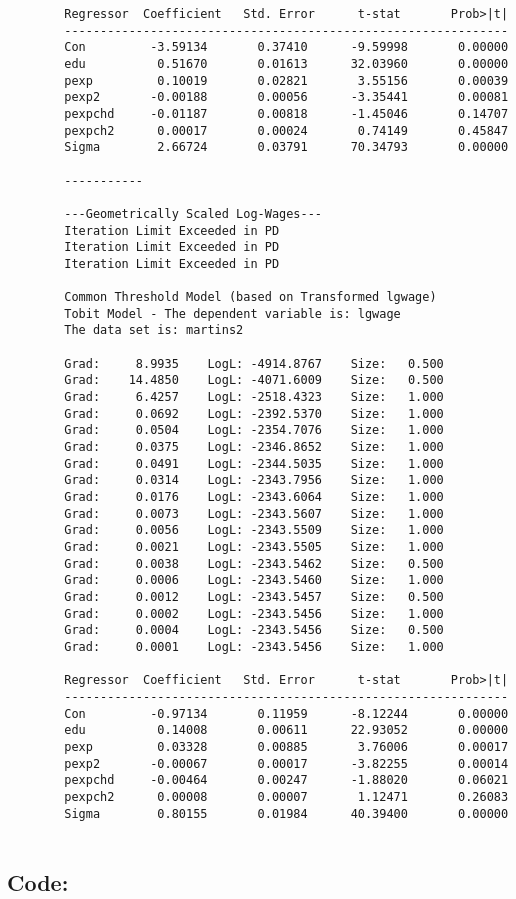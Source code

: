 \documentclass[12pt]{article}
\begin{document}
\begin{verbatim}
		Regressor  Coefficient	 Std. Error 	 t-stat       Prob>|t|
		--------------------------------------------------------------
		Con         -3.59134       0.37410      -9.59998       0.00000 
		edu          0.51670       0.01613      32.03960       0.00000 
		pexp         0.10019       0.02821       3.55156       0.00039 
		pexp2       -0.00188       0.00056      -3.35441       0.00081 
		pexpchd     -0.01187       0.00818      -1.45046       0.14707 
		pexpch2      0.00017       0.00024       0.74149       0.45847 
		Sigma        2.66724       0.03791      70.34793       0.00000 
		
		----------- 
		
		---Geometrically Scaled Log-Wages--- 
		Iteration Limit Exceeded in PD
		Iteration Limit Exceeded in PD
		Iteration Limit Exceeded in PD
		
		Common Threshold Model (based on Transformed lgwage)
		Tobit Model - The dependent variable is: lgwage
		The data set is: martins2
		
		Grad:     8.9935    LogL: -4914.8767    Size:   0.500
		Grad:    14.4850    LogL: -4071.6009    Size:   0.500
		Grad:     6.4257    LogL: -2518.4323    Size:   1.000
		Grad:     0.0692    LogL: -2392.5370    Size:   1.000
		Grad:     0.0504    LogL: -2354.7076    Size:   1.000
		Grad:     0.0375    LogL: -2346.8652    Size:   1.000
		Grad:     0.0491    LogL: -2344.5035    Size:   1.000
		Grad:     0.0314    LogL: -2343.7956    Size:   1.000
		Grad:     0.0176    LogL: -2343.6064    Size:   1.000
		Grad:     0.0073    LogL: -2343.5607    Size:   1.000
		Grad:     0.0056    LogL: -2343.5509    Size:   1.000
		Grad:     0.0021    LogL: -2343.5505    Size:   1.000
		Grad:     0.0038    LogL: -2343.5462    Size:   0.500
		Grad:     0.0006    LogL: -2343.5460    Size:   1.000
		Grad:     0.0012    LogL: -2343.5457    Size:   0.500
		Grad:     0.0002    LogL: -2343.5456    Size:   1.000
		Grad:     0.0004    LogL: -2343.5456    Size:   0.500
		Grad:     0.0001    LogL: -2343.5456    Size:   1.000
		
		Regressor  Coefficient	 Std. Error 	 t-stat       Prob>|t|
		--------------------------------------------------------------
		Con         -0.97134       0.11959      -8.12244       0.00000 
		edu          0.14008       0.00611      22.93052       0.00000 
		pexp         0.03328       0.00885       3.76006       0.00017 
		pexp2       -0.00067       0.00017      -3.82255       0.00014 
		pexpchd     -0.00464       0.00247      -1.88020       0.06021 
		pexpch2      0.00008       0.00007       1.12471       0.26083 
		Sigma        0.80155       0.01984      40.39400       0.00000 
		
	\end{verbatim}
	\subsection*{Code:}
	
	
		
			
\end{document}
